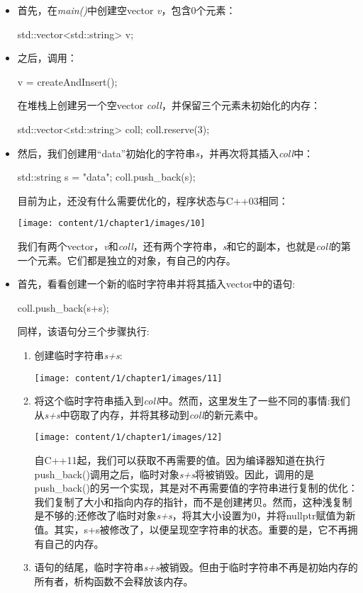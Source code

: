\begin{itemize}
	\item 首先，在\textit{main()}中创建空vector \textit{v}，包含0个元素：
	\begin{cppcode}
std::vector<std::string> v;
	\end{cppcode}
	\item 之后，调用：
\begin{cppcode}
v = createAndInsert();
\end{cppcode}
	在堆栈上创建另一个空vector \textit{coll}，并保留三个元素未初始化的内存：
\begin{cppcode}
std::vector<std::string> coll;
coll.reserve(3);
\end{cppcode}
	\item 然后，我们创建用“data”初始化的字符串\textit{s}，并再次将其插入\textit{coll}中：
\begin{cppcode}
std::string s = "data";
coll.push_back(s);
\end{cppcode}
	目前为止，还没有什么需要优化的，程序状态与C++03相同：
\begin{center}
		\texttt{[image: content/1/chapter1/images/10]}
	\end{center}
	我们有两个vector，\textit{v}和\textit{coll}，还有两个字符串，\textit{s}和它的副本，也就是\textit{coll}的第一个元素。它们都是独立的对象，有自己的内存。

	\item 首先，看看创建一个新的临时字符串并将其插入vector中的语句:
\begin{cppcode}
coll.push_back(s+s);
\end{cppcode}
	同样，该语句分三个步骤执行:

	\begin{enumerate}
		\item 创建临时字符串\textit{s+s}:

		\begin{center}
			\texttt{[image: content/1/chapter1/images/11]}
		\end{center}
		\item 将这个临时字符串插入到\textit{coll}中。然而，这里发生了一些不同的事情:我们从\textit{s+s}中窃取了内存，并将其移动到\textit{coll}的新元素中。

		\begin{center}
			\texttt{[image: content/1/chapter1/images/12]}
		\end{center}
		自C++11起，我们可以获取不再需要的值。因为编译器知道在执行push_back()调用之后，临时对象\textit{s+s}将被销毁。因此，调用的是push_back()的另一个实现，其是对不再需要值的字符串进行复制的优化：我们复制了大小和指向内存的指针，而不是创建拷贝。然而，这种浅复制是不够的;还修改了临时对象\textit{s+s}，将其大小设置为0，并将nullptr赋值为新值。其实，s+s被修改了，以便呈现空字符串的状态。重要的是，它不再拥有自己的内存。
		\item 语句的结尾，临时字符串\textit{s+s}被销毁。但由于临时字符串不再是初始内存的所有者，析构函数不会释放该内存。


\end{enumerate}
\end{itemize}
